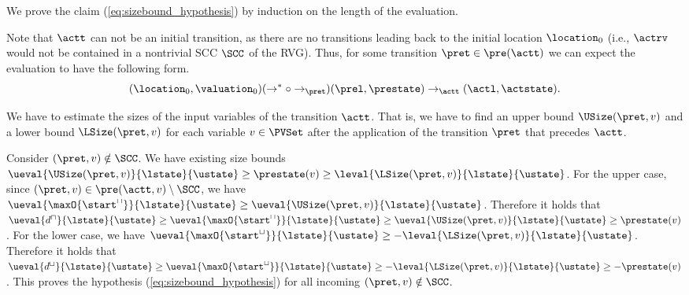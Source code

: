 We prove the claim (\ref{eq:sizebound_hypothesis}) by induction on the length of the evaluation.

Note that $\actt$ can not be an initial transition, as there are no transitions leading back to the initial location $\location_0$
(i.e., $\actrv$ would not be contained in a nontrivial SCC $\SCC$ of the RVG).
Thus, for some transition $\pret \in \pre(\actt)$ we can expect the evaluation to have the following form.
\[ (\location_0, \valuation_0) (\rightarrow^* \circ \rightarrow_\pret) (\prel, \prestate) \rightarrow_\actt (\actl, \actstate). \]

We have to estimate the sizes of the input variables of the transition $\actt$.
That is, we have to find an upper bound $\USize(\pret, v)$ and a lower bound $\LSize(\pret, v)$ for each variable $v \in \PVSet$ after the application of the transition $\pret$ that precedes $\actt$.

Consider $(\pret, v) \notin \SCC$.
We have existing size bounds $\ueval{\USize(\pret, v)}{\lstate}{\ustate} \geq \prestate(v) \geq \leval{\LSize(\pret, v)}{\lstate}{\ustate}$.
For the upper case, since $(\pret, v) \in \pre(\actt, v) \setminus \SCC$, we have $\ueval{\maxO{\start^\sqcap}}{\lstate}{\ustate} \geq \ueval{\USize(\pret, v)}{\lstate}{\ustate}$.
Therefore it holds that $\ueval{d^\sqcap}{\lstate}{\ustate} \geq \ueval{\maxO{\start^\sqcap}}{\lstate}{\ustate} \geq \ueval{\USize(\pret, v)}{\lstate}{\ustate} \geq \prestate(v)$.
For the lower case, we have $\ueval{\maxO{\start^\sqcup}}{\lstate}{\ustate} \geq -\leval{\LSize(\pret, v)}{\lstate}{\ustate}$.
Therefore it holds that $\ueval{d^\sqcup}{\lstate}{\ustate} \geq \ueval{\maxO{\start^\sqcup}}{\lstate}{\ustate} \geq -\leval{\LSize(\pret, v)}{\lstate}{\ustate} \geq -\prestate(v)$.
This proves the hypothesis (\ref{eq:sizebound_hypothesis}) for all incoming $(\pret, v) \notin \SCC$.

